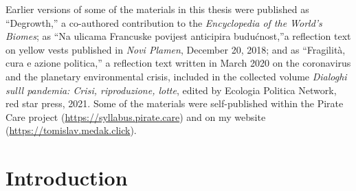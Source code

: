 \documentclass[a4paper, nobind]{templates/ociamthesis}
\begin{document}
\begin{romanpages}
\begin{acknowledgements}
  \mbox{}
  \vfill

  Earlier versions of some of the materials in this thesis were published as ``Degrowth,'' a co-authored contribution to the \emph{Encyclopedia of the World's Biomes}; as ``Na ulicama Francuske povijest anticipira budućnost,''a reflection text on yellow vests published in \emph{Novi Plamen}, December 20, 2018; and as ``Fragilità, cura e azione politica,'' a reflection text written in March 2020 on the coronavirus and the planetary environmental crisis, included in the collected volume \emph{Dialoghi sulll pandemia: Crisi, riproduzione, lotte}, edited by Ecologia Politica Network, red star press, 2021. Some of the materials were self-published within the Pirate Care project (\url{https://syllabus.pirate.care}) and on my website (\url{https://tomislav.medak.click}).
\end{acknowledgements}



  \dominitoc %

\flushbottom

\tableofcontents

\listoffigures
	\mtcaddchapter



\end{romanpages}

\flushbottom

\hypertarget{introduction}{%
\chapter{Introduction}\label{introduction}}
\end{document}
